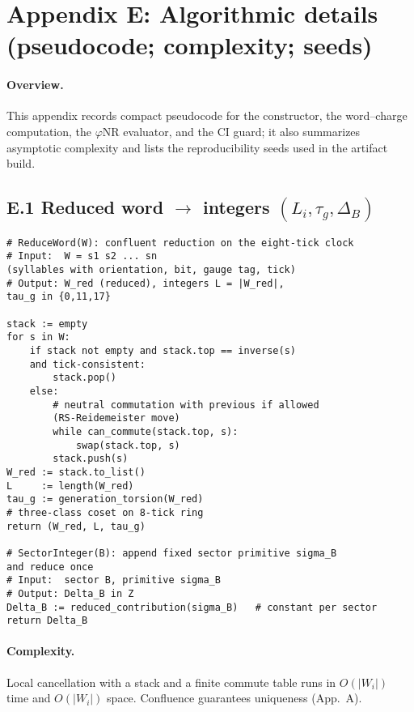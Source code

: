 \documentclass[epjc3]{svjour3}
\begin{document}
\section*{Appendix E: Algorithmic details (pseudocode; complexity; seeds)}

\paragraph{Overview.}
This appendix records compact pseudocode for the constructor, the word–charge computation, the $\varphi$NR evaluator, and the CI guard; it also summarizes asymptotic complexity and lists the reproducibility seeds used in the artifact build.

\subsection*{E.1 Reduced word $\to$ integers $(L_i,\tau_g,\Delta_B)$}
\begin{verbatim}
# ReduceWord(W): confluent reduction on the eight-tick clock
# Input:  W = s1 s2 ... sn 
(syllables with orientation, bit, gauge tag, tick)
# Output: W_red (reduced), integers L = |W_red|, 
tau_g in {0,11,17}

stack := empty
for s in W:
    if stack not empty and stack.top == inverse(s) 
    and tick-consistent:
        stack.pop()
    else:
        # neutral commutation with previous if allowed 
        (RS-Reidemeister move)
        while can_commute(stack.top, s):
            swap(stack.top, s)
        stack.push(s)
W_red := stack.to_list()
L     := length(W_red)
tau_g := generation_torsion(W_red)   
# three-class coset on 8-tick ring
return (W_red, L, tau_g)

# SectorInteger(B): append fixed sector primitive sigma_B 
and reduce once
# Input:  sector B, primitive sigma_B
# Output: Delta_B in Z
Delta_B := reduced_contribution(sigma_B)   # constant per sector
return Delta_B
\end{verbatim}

\paragraph{Complexity.}
Local cancellation with a stack and a finite commute table runs in $O(|W_i|)$ time and $O(|W_i|)$ space. Confluence guarantees uniqueness (App.~A).
\end{document}
